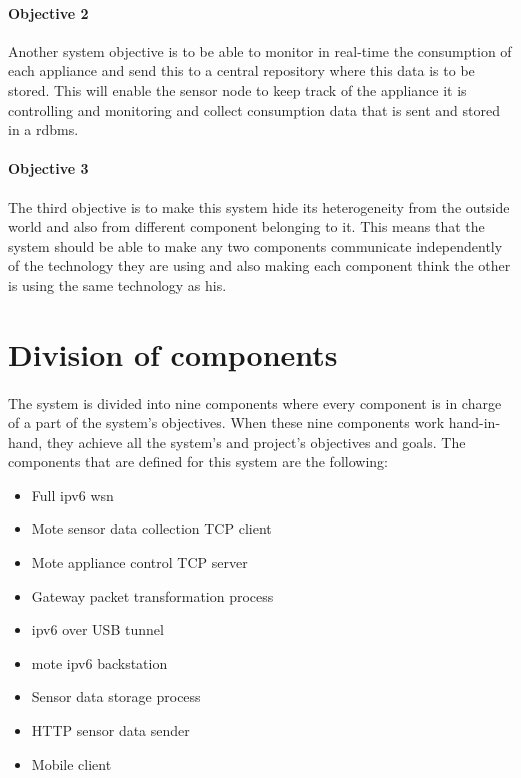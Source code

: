 \documentclass[oneside,12pt,a4paper,final]{book}
\begin{document}
\paragraph{Objective 2}
Another system objective is to be able to monitor in real-time the consumption of each appliance and send this to a central repository where this data is to be stored. This will enable the sensor node to keep track of the appliance it is controlling and monitoring and collect consumption data that is sent and stored in a \gls{rdbms}.
\paragraph{Objective 3}
The third objective is to make this system hide its heterogeneity from the outside world and also from different component belonging to it. This means that the system should be able to make any two components communicate independently of the technology they are using and also making each component think the other is using the same technology as his. 

\section{Division of components}
\paragraph{}
The system is divided into nine components where every component is in charge of a part of the system's objectives. When these nine components work hand-in-hand, they achieve all the system's and project's objectives and goals. The components that are defined for this system are the following:

\begin{itemize}
\item Full \gls{ipv6} \gls{wsn}
\item Mote sensor data collection TCP client
\item Mote appliance control TCP server
\item Gateway packet transformation process
\item \gls{ipv6} over USB tunnel
\item mote \gls{ipv6} backstation
\item Sensor data storage process
\item HTTP sensor data sender
\item Mobile client
\end{itemize}
\end{document}
